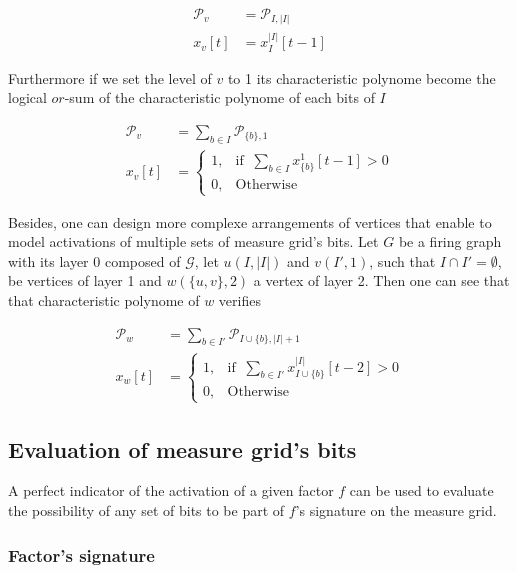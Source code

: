 \documentclass[a4paper, 11pt]{article}
\begin{document}
\begin{align*}
\mathcal{P}_{v} &= \mathcal{P}_{I, \vert I \vert}\\
x_v[t] &= x_{I}^{\vert I \vert}[t - 1] 
\end{align*}

Furthermore if we set the level of $v$ to 1 its characteristic polynome become the logical $or$-sum of the characteristic polynome of each bits of $I$

\begin{align*}
\mathcal{P}_{v} &= \sum_{b \in I} \mathcal{P}_{\{ b \}, 1}\\
x_v[t] &= \begin{cases} 1, & \text{if }\ \sum_{b \in I} x_{\{ b \}}^1[t - 1] > 0\\ 0, & \text{Otherwise} \end{cases}
\end{align*}


Besides, one can design more complexe arrangements of vertices that enable to model activations of multiple sets of measure grid's bits. Let $G$ be a firing graph with its layer 0 composed of $\mathcal{G}$, let $u(I, \vert I \vert)$ and $v(I', 1)$, such that $I \cap I' = \emptyset$, be vertices of layer 1 and $w(\{ u, v \}, 2)$ a vertex of layer 2. Then one can see that that characteristic polynome of $w$ verifies

\begin{align*}
\mathcal{P}_{w} &= \sum_{b \in I'} \mathcal{P}_{I \cup \{ b \}, \vert I \vert + 1}\\
x_w[t] &= \begin{cases} 1, & \text{if }\ \sum_{b \in I'} x_{I \cup \{ b \}}^{\vert I \vert}[t - 2] > 0\\ 0, & \text{Otherwise} \end{cases}
\end{align*}


\subsection{Evaluation of measure grid's bits}

A perfect indicator of the activation of a given factor $f$ can be used to evaluate the possibility of any set of bits to be part of $f$'s signature on the measure grid. 

\subsubsection*{Factor's signature}
\end{document}

